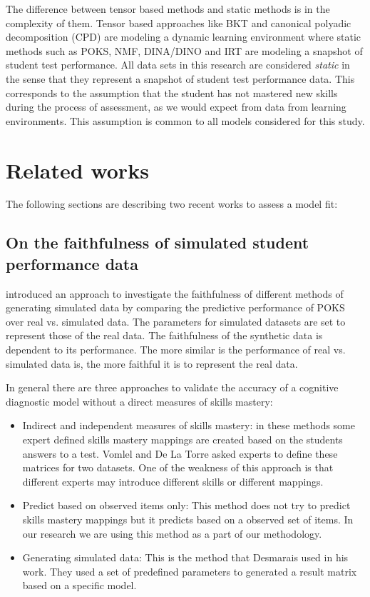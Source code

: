 The difference between tensor based methods and static methods is in the complexity of them. Tensor based approaches like BKT and canonical polyadic decomposition (CPD) are modeling a dynamic learning environment where static methods such as POKS, NMF, DINA/DINO and IRT are modeling a snapshot of student test performance. All data sets in this research are considered \textit{static} in the sense that they represent a snapshot of student test performance data.  This corresponds to the assumption that the student has not mastered new skills during the process of assessment, as we would expect from data from learning environments.  This assumption is common to all models considered for this study.

\section{Related works}

The following sections are describing two recent works \citep{Desmarais2010,Rosenberg2015} to assess a model fit:


\subsection{On the faithfulness of simulated student performance data}

\citet{Desmarais2010} introduced an approach to investigate the faithfulness of different methods of generating simulated data by comparing the predictive performance of POKS over real vs. simulated data. The parameters for simulated datasets are set to represent those of the real data. The faithfulness of the synthetic data is dependent to its performance. The more similar is the performance of real vs. simulated data is, the more faithful it is to represent the real data.

In general there are three approaches to validate the accuracy of a cognitive diagnostic model without a direct measures of skills mastery:

\begin{itemize}
\item Indirect and independent measures of skills mastery: in these methods some expert defined skills mastery mappings are created based on the students answers to a test. Vomlel \citep{vomlel:2004} and De La Torre \citep{delaTorre2008} asked experts to define these matrices for two datasets. One of the weakness of this approach is that different experts may introduce different skills or different mappings.

\item Predict based on observed items only: This method does not try to predict skills mastery mappings but it predicts based on a observed set of items. In our research we are using this method as a part of our methodology.

\item Generating simulated data: This is the method that Desmarais \citep{Desmarais2010} used in his work. They used a set of predefined parameters to generated a result matrix based on a specific model.

\end{itemize}
